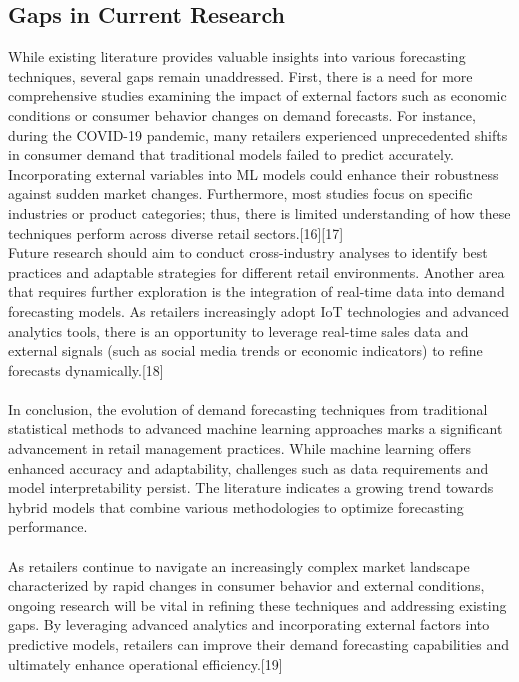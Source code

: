 \documentclass[10pt]{report}
\begin{document}
\begin{center}
\subsection{Gaps in Current Research}\label{AA}
While existing literature provides valuable insights into various forecasting techniques, several gaps remain unaddressed. First, there is a need for more comprehensive studies examining the impact of external factors such as economic conditions or consumer behavior changes on demand forecasts. For instance, during the COVID-19 pandemic, many retailers experienced unprecedented shifts in consumer demand that traditional models failed to predict accurately. Incorporating external variables into ML models could enhance their robustness against sudden market changes.
Furthermore, most studies focus on specific industries or product categories; thus, there is limited understanding of how these techniques perform across diverse retail sectors.[16][17] \\
Future research should aim to conduct cross-industry analyses to identify best practices and adaptable strategies for different retail environments.
Another area that requires further exploration is the integration of real-time data into demand forecasting models. As retailers increasingly adopt IoT technologies and advanced analytics tools, there is an opportunity to leverage real-time sales data and external signals (such as social media trends or economic indicators) to refine forecasts dynamically.[18]\\
\\
In conclusion, the evolution of demand forecasting techniques from traditional statistical methods to advanced machine learning approaches marks a significant advancement in retail management practices. While machine learning offers enhanced accuracy and adaptability, challenges such as data requirements and model interpretability persist. The literature indicates a growing trend towards hybrid models that combine various methodologies to optimize forecasting performance.\\
\\
As retailers continue to navigate an increasingly complex market landscape characterized by rapid changes in consumer behavior and external conditions, ongoing research will be vital in refining these techniques and addressing existing gaps. By leveraging advanced analytics and incorporating external factors into predictive models, retailers can improve their demand forecasting capabilities and ultimately enhance operational efficiency.[19]


\end{center}
\end{document}

